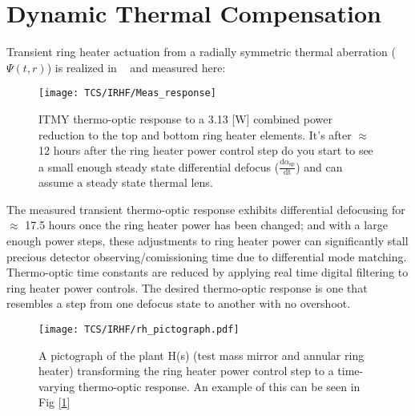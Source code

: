 \section{Dynamic Thermal Compensation}
Transient ring heater actuation from a radially symmetric thermal aberration ($\Psi(t,r)$) is realized in ~\cite{ramette:2016} and measured here:

\begin{figure}[H]
    \centering
     \texttt{[image: TCS/IRHF/Meas\_response]}
     \caption{ITMY thermo-optic response to a 3.13 [W] combined power reduction to the top and bottom ring heater elements. It's after $\approx$ 12 hours after the ring heater power control step do you start to see a small enough steady state differential defocus ($\frac{\mathrm{d} \alpha_\mathrm{sp}}{\mathrm{dt}}$) and can assume a steady state thermal lens. }
     \label{fig:RHresp}
\end{figure}

The measured transient thermo-optic response exhibits differential defocusing for $\approx$ 17.5 hours once the ring heater power has been changed; and with a large enough power steps, these adjustments to ring heater power can significantly stall precious detector observing/comissioning time due to differential mode matching. Thermo-optic time constants are reduced by applying real time digital filtering to ring heater power controls. The desired thermo-optic response is one that resembles a step from one defocus state to another with no overshoot. 

\iffalse
\begin{figure}[H]
	\centering
	\texttt{[image: TCS/IRHF/RH\_control\_diagram.pdf]}
	\caption{A simple controls diagram depicting the concept of a RH control pre-filter (\textbf{G(s)}) taking a step input (\textbf{u(t)}) and transforming it before reaching the thermo-optic plant (\textbf{H(s)}) with output can also be generalized to an adaptive optics control loop.}
	\label{fig:RH_control}
\end{figure}
\fi 

\begin{figure}[H]
    \centering
    \texttt{[image: TCS/IRHF/rh\_pictograph.pdf]}
    \caption{A pictograph of the plant H(s) (test mass mirror and annular ring heater) transforming the ring heater power control step to a time-varying thermo-optic response. An example of this can be seen in Fig [\ref{fig:RHresp}]}
    \label{fig:justplant}
\end{figure}

